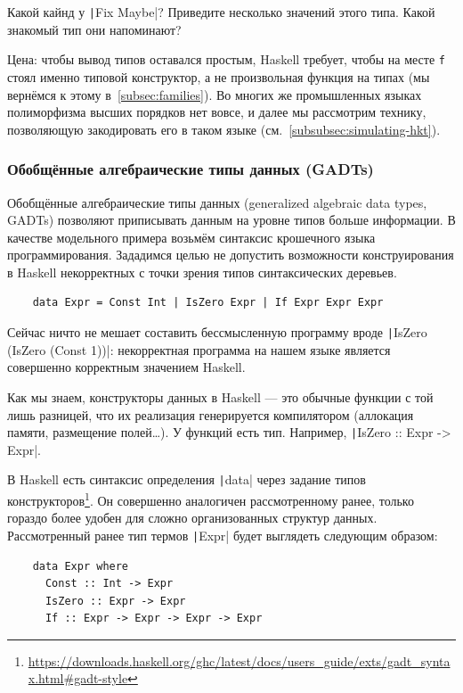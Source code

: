 \begin{task}
    Какой кайнд у \texttt|Fix Maybe|?
    Приведите несколько значений этого типа.
    Какой знакомый тип они напоминают?
\end{task}

Цена: чтобы вывод типов оставался простым, Haskell требует, чтобы на месте \texttt{f} стоял именно типовой конструктор, а не произвольная функция на типах (мы вернёмся к этому в~\ref{subsec:families}).
Во многих же промышленных языках полиморфизма высших порядков нет вовсе, и далее мы рассмотрим технику, позволяющую закодировать его в таком языке (см.~\ref{subsubsec:simulating-hkt}).


\subsubsection{Обобщённые алгебраические типы данных (GADTs)} \label{subsubsec:gadts}

Обобщённые алгебраические типы данных (generalized algebraic data types, GADTs) позволяют приписывать данным на уровне типов больше информации.
В качестве модельного примера возьмём синтаксис крошечного языка программирования.
Зададимся целью не допустить возможности конструирования в Haskell некорректных с точки зрения типов синтаксических деревьев.
\begin{verbatim}
    data Expr = Const Int | IsZero Expr | If Expr Expr Expr
\end{verbatim}
Сейчас ничто не мешает составить бессмысленную программу вроде \texttt|IsZero (IsZero (Const 1))|: некорректная программа на нашем языке является совершенно корректным значением Haskell.

Как мы знаем, конструкторы данных в Haskell --- это обычные функции с той лишь разницей, что их реализация генерируется компилятором (аллокация памяти, размещение полей\ldots).
У функций есть тип.
Например, \texttt|IsZero :: Expr -> Expr|.

В Haskell есть синтаксис определения \texttt|data| через задание типов конструкторов\footnote{\url{https://downloads.haskell.org/ghc/latest/docs/users_guide/exts/gadt_syntax.html\#gadt-style}}.
Он совершенно аналогичен рассмотренному ранее, только гораздо более удобен для сложно организованных структур данных.
Рассмотренный ранее тип термов \texttt|Expr| будет выглядеть следующим образом:
\begin{verbatim}
    data Expr where
      Const :: Int -> Expr
      IsZero :: Expr -> Expr
      If :: Expr -> Expr -> Expr -> Expr
\end{verbatim}

